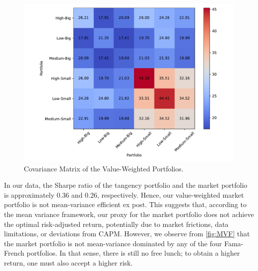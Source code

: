 \documentclass[a4paper,10pt,american]{article}
\begin{document}
\begin{figure}[H]
\centering
\includegraphics[width=1\linewidth]{../Plots/covariance_matrix.pdf}
\caption{Covariance Matrix of the Value-Weighted Portfolios.}
\label{fig:CMVP}
\end{figure}

In our data, the Sharpe ratio of the tangency portfolio and the market 
portfolio is approximately $0.36$ and $0.26$, respectively. Hence, our 
value-weighted market portfolio is not mean-variance efficient ex post. 
This suggests that, according to the mean variance framework, our proxy for 
the market portfolio does not achieve the optimal risk-adjusted return, 
potentially due to market frictions, data limitations, or deviations from 
CAPM. However, we observe from \autoref{fig:MVF} that the market portfolio is not 
mean-variance dominated by any of the four Fama-French portfolios. In that 
sense, there is still no free lunch; to obtain a higher return, one must 
also accept a higher risk. 
\end{document}
